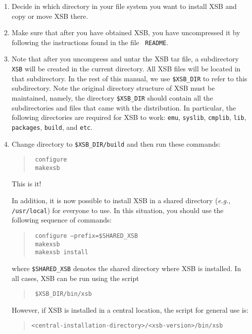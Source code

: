 \begin{enumerate}
\item	Decide in which directory in your file system you want to install
  XSB and copy or move XSB there.
\item Make sure that after you have obtained XSB, you have
  uncompressed it by following the instructions found in the file {\tt
    README}.
  
\item Note that after you uncompress and untar the XSB tar file, a
  subdirectory {\tt XSB} will be created in the current directory. All
  XSB files will be located in that subdirectory.  In the rest of this
  manual, we use {\tt \$XSB\_DIR} to refer to this subdirectory.  Note
  the original directory structure of XSB must be maintained, namely,
  the directory {\tt \$XSB\_DIR} should contain all the subdirectories
  and files that came with the distribution. In particular, the
  following directories are required for XSB to work: \verb'emu',
  \verb'syslib', \verb'cmplib', \verb'lib', \verb'packages',
  \verb'build', and \verb'etc'.

\item Change directory to {\tt \$XSB\_DIR/build} and then run these commands:
  \begin{quote}
    \tt
    configure\\
    \tt
    makexsb
  \end{quote}
  This is it!
  
  In addition, it is now possible to install XSB in a shared directory
  ({\it e.g.}, {\tt /usr/local}) for everyone to use.  In this situation,
  you should use the following sequence of commands:
  \begin{quote}
    \tt
    configure --prefix=\$SHARED\_XSB\\
    \tt
    makexsb\\
    \tt
    makexsb install
  \end{quote}
  where {\tt \$SHARED\_XSB}  denotes the shared directory where XSB is
  installed.  In all cases, XSB can be run using the script
  \begin{quote}
    \tt
    \$XSB\_DIR/bin/xsb
  \end{quote}
  However, if XSB is installed in a central location, the script for
  general use is:
  \begin{quote}
    \verb'<central-installation-directory>/<xsb-version>/bin/xsb'
  \end{quote}
\end{enumerate}

